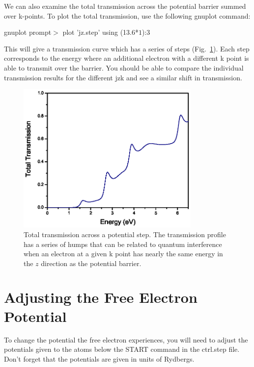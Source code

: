 \documentclass[10pt]{article}
\begin{document}
We can also examine the total transmission across the potential barrier summed over k-points.  To plot the total transmission, use the following gnuplot command:

\begin{center}
gnuplot prompt$>$ plot 'jz.step' using (13.6*$1$):3
\end{center}

This will give a transmission curve which has a series of steps (Fig.~\ref{total_trans_step}).  Each step corresponds to the energy where an additional electron with a different k point is able to transmit over the barrier.  You should be able to compare the individual transmission results for the different jzk and see a similar shift in transmission.

\begin{figure}
\begin{center}
\centering
\includegraphics[angle=0,width=9.00cm]{step_transmission.eps}
\caption{Total transmission across a potential step.  The transmission profile has a series of humps that can be related to quantum interference when an electron at a given k point has nearly the same energy in the $z$ direction as the potential barrier.}
\label{total_trans_step} 
\end{center}
\end{figure}


\section{Adjusting the Free Electron Potential}

To change the potential the free electron experiences, you will need to adjust the potentials given to the atoms below the START command in the ctrl.step file.  Don't forget that the potentials are given in units of Rydbergs.
\end{document}
